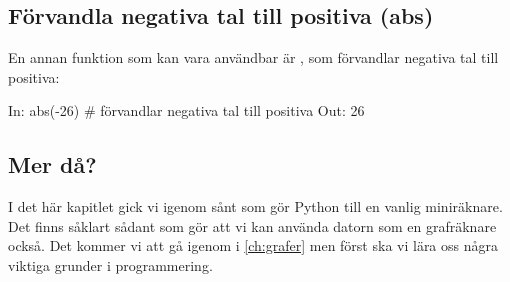 \subsection{Förvandla negativa tal till positiva (abs)}\label{subsec:abs}
En annan funktion som kan vara användbar är , som förvandlar negativa tal till positiva:

\begin{python}[caption={abs},label={}]
In: abs(-26) # förvandlar negativa tal till positiva
Out: 26
\end{python}

\subsection{Mer då?}
I det här kapitlet gick vi igenom sånt som gör Python till en vanlig miniräknare. Det finns såklart sådant som gör att vi kan använda datorn som en grafräknare också. Det kommer vi att gå igenom i \autoref{ch:grafer} men först ska vi lära oss några viktiga grunder i programmering.
